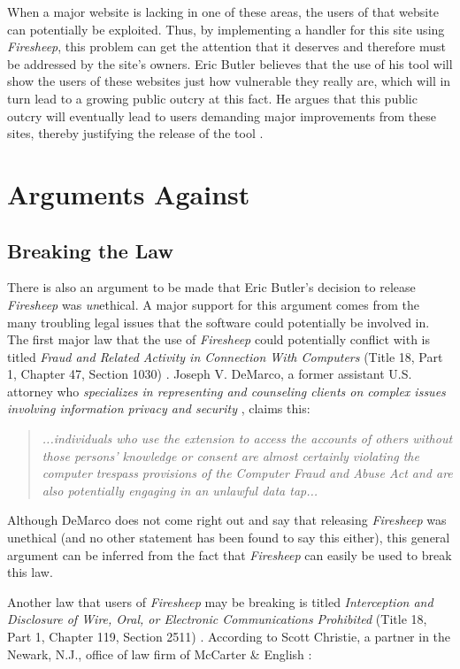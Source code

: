 \documentclass[11pt]{article}
\begin{document}
\begin{multicols}{2}
When a major website is lacking in one of these areas, the users of that website can potentially be exploited. Thus, by implementing a handler for this site using \emph{Firesheep}, this problem can get the attention that it deserves and therefore must be addressed by the site's owners. Eric Butler believes that the use of his tool will show the users of these websites just how vulnerable they really are, which will in turn lead to a growing public outcry at this fact. He argues that this public outcry will eventually lead to users demanding major improvements from these sites, thereby justifying the release of the tool \cite{toorcon_slides}.

\section{Arguments Against}
\subsection{Breaking the Law}
There is also an argument to be made that Eric Butler's decision to release \emph{Firesheep} was \emph{un}ethical. A major support for this argument comes from the many troubling legal issues that the software could potentially be involved in. The first major law that the use of \emph{Firesheep} could potentially conflict with is titled \emph{Fraud and Related Activity in Connection With Computers} (Title 18, Part 1, Chapter 47, Section 1030) \cite{law_1}. Joseph V. DeMarco, a former assistant U.S. attorney who \emph{specializes in representing and counseling clients on complex issues involving information privacy and security} \cite{legal_forbes} \cite{demarco}, claims this:

\begin{quote}
  \emph{...individuals who use the extension to access the accounts of others without those persons’ knowledge or consent are almost certainly violating the computer trespass provisions of the Computer Fraud and Abuse Act and are also potentially engaging in an unlawful data tap...} \cite{legal_forbes}
\end{quote}

Although DeMarco does not come right out and say that releasing \emph{Firesheep} was unethical (and no other statement has been found to say this either), this general argument can be inferred from the fact that \emph{Firesheep} can easily be used to break this law.

Another law that users of \emph{Firesheep} may be breaking is titled \emph{Interception and Disclosure of Wire, Oral, or Electronic Communications Prohibited} (Title 18, Part 1, Chapter 119, Section 2511) \cite{law_2}. According to Scott Christie, a partner in the Newark, N.J., office of law firm of McCarter \& English \cite{legal_cw}:


\end{multicols}
\end{document}
